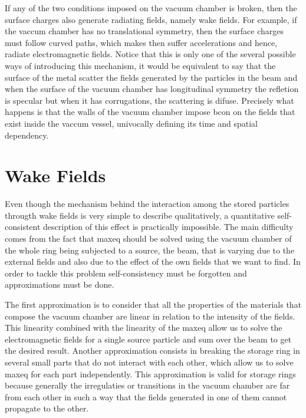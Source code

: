     If any of the two conditions imposed on the vacuum chamber is broken, then the surface charges also generate radiating fields, namely wake fields. For example, if the vaccum chamber has no translational symmetry, then the surface charges must follow curved paths, which makes then suffer accelerations and hence, radiate electromagnetic fields. Notice that this is only one of the several possible ways of introducing this mechanism, it would be equivalent to say that the surface of the metal scatter the fields generated by the particles in the beam and when the surface of the vacuum chamber has longitudinal symmetry the refletion is specular but when it has corrugations, the scattering is difuse. Precisely what happens is that the walls of the vacuum chamber impose \gls{bcon} on the fields that exist inside the vaccum vessel, univocally defining its time and spatial dependency.

\section{Wake Fields}\label{sec:wake_fields}

    Even though the mechanism behind the interaction among the stored particles througth wake fields is very simple to describe qualitatively, a quantitative self-consistent description of this effect is practically impossible. The main difficulty comes from the fact that \gls{maxeq} should be solved using the vacuum chamber of the whole ring being subjected to a source, the beam, that is varying due to the external fields and also due to the effect of the own fields that we want to find. In order to tackle this problem self-consistency must be forgotten and approximations must be done.

    The first approximation is to consider that all the properties of the materials that compose the vacuum chamber are linear in relation to the intensity of the fields. This linearity combined with the linearity of the \gls{maxeq} allow us to solve the electromagnetic fields for a single source particle and sum over the beam to get the desired result. Another approximation consists in breaking the storage ring in several small parts that do not interact with each other, which allow us to solve \gls{maxeq} for each part independently. This approximation is valid for storage rings because generally the irregulaties or transitions in the vacuum chamber are far from each other in such a way that the fields generated in one of them cannot propagate to the other.

